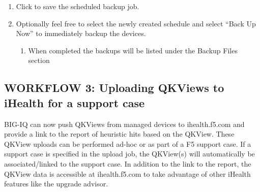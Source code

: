 \documentclass[letterpaper,10pt,english]{sphinxmanual}
\begin{document}
\begin{enumerate}
\begin{itemize}
\end{itemize}

\item {} 
Click  to save the scheduled backup job.

\item {} 
Optionally feel free to select the newly created schedule and select
“Back Up Now” to immediately backup the devices.
\begin{enumerate}
\item {} 
When completed the backups will be listed under the Backup Files
section

\end{enumerate}

\end{enumerate}


\subsection{WORKFLOW 3: Uploading QKViews to iHealth for a support case}
\label{\detokenize{class1/module4/lab4:workflow-3-uploading-qkviews-to-ihealth-for-a-support-case}}
BIG-IQ can now push QKViews from managed devices to ihealth.f5.com and
provide a link to the report of heuristic hits based on the QKView.
These QKView uploads can be performed ad-hoc or as part of a F5 support
case. If a support case is specified in the upload job, the QKView(s)
will automatically be associated/linked to the support case. In addition
to the link to the report, the QKView data is accessible at
ihealth.f5.com to take advantage of other iHealth features like the
upgrade advisor.
\end{document}
